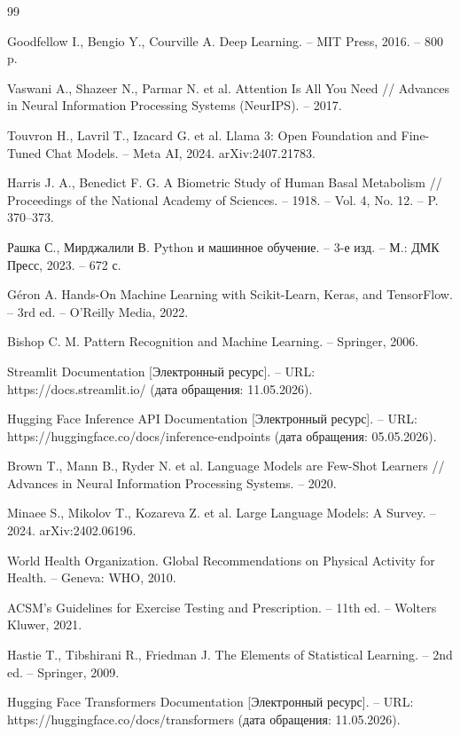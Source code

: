 \documentclass[14pt, a4paper]{extarticle}
\begin{document}
\newpage
\renewcommand\refname{\centering СПИСОК ИСПОЛЬЗОВАННЫХ ИСТОЧНИКОВ}
\clearpage
{}
\begin{thebibliography}{99}

Goodfellow I., Bengio Y., Courville A. Deep Learning. – MIT Press, 2016. – 800 p.

Vaswani A., Shazeer N., Parmar N. et al. Attention Is All You Need // Advances in Neural Information Processing Systems (NeurIPS). – 2017.

Touvron H., Lavril T., Izacard G. et al. Llama 3: Open Foundation and Fine-Tuned Chat Models. – Meta AI, 2024. arXiv:2407.21783.

Harris J. A., Benedict F. G. A Biometric Study of Human Basal Metabolism // Proceedings of the National Academy of Sciences. – 1918. – Vol. 4, No. 12. – P. 370--373.

Рашка С., Мирджалили В. Python и машинное обучение. – 3-е изд. – М.: ДМК Пресс, 2023. – 672 с.

Géron A. Hands-On Machine Learning with Scikit-Learn, Keras, and TensorFlow. – 3rd ed. – O'Reilly Media, 2022.

Bishop C. M. Pattern Recognition and Machine Learning. – Springer, 2006.

Streamlit Documentation [Электронный ресурс]. – URL: https://docs.streamlit.io/ (дата обращения: 11.05.2026).

Hugging Face Inference API Documentation [Электронный ресурс]. – URL: https://huggingface.co/docs/inference-endpoints (дата обращения: 05.05.2026).

Brown T., Mann B., Ryder N. et al. Language Models are Few-Shot Learners // Advances in Neural Information Processing Systems. – 2020.

Minaee S., Mikolov T., Kozareva Z. et al. Large Language Models: A Survey. – 2024. arXiv:2402.06196.

World Health Organization. Global Recommendations on Physical Activity for Health. – Geneva: WHO, 2010.

ACSM’s Guidelines for Exercise Testing and Prescription. – 11th ed. – Wolters Kluwer, 2021.

Hastie T., Tibshirani R., Friedman J. The Elements of Statistical Learning. – 2nd ed. – Springer, 2009.

Hugging Face Transformers Documentation [Электронный ресурс]. – URL: https://huggingface.co/docs/transformers (дата обращения: 11.05.2026).

\end{thebibliography}
\end{document}
